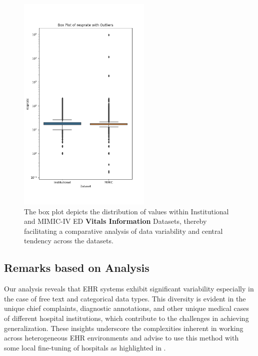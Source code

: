 \documentclass{article}
\theoremstyle{plain}
\theoremstyle{definition}
\theoremstyle{remark}
\begin{document}
\begin{figure}[h!]
   \includegraphics[width=2.5in]{plots/resprate_boxplot.png} 
   \caption{The box plot depicts the distribution of values within Institutional and MIMIC-IV ED \textbf{Vitals Information} Datasets, thereby facilitating a comparative analysis of data variability and central tendency across the datasets.}
   \label{app6} 
 \end{figure} 

\subsection*{Remarks based on Analysis}

Our analysis reveals that EHR systems exhibit significant variability especially in the case of free text and categorical data types. This diversity is evident in the unique chief complaints, diagnostic annotations, and other unique medical cases of different hospital institutions, which contribute to the challenges in achieving generalization. These insights underscore the complexities inherent in working across heterogeneous EHR environments and advise to use this method with some local fine-tuning of hospitals as highlighted in \citep{jiang2023health}.
\end{document}
